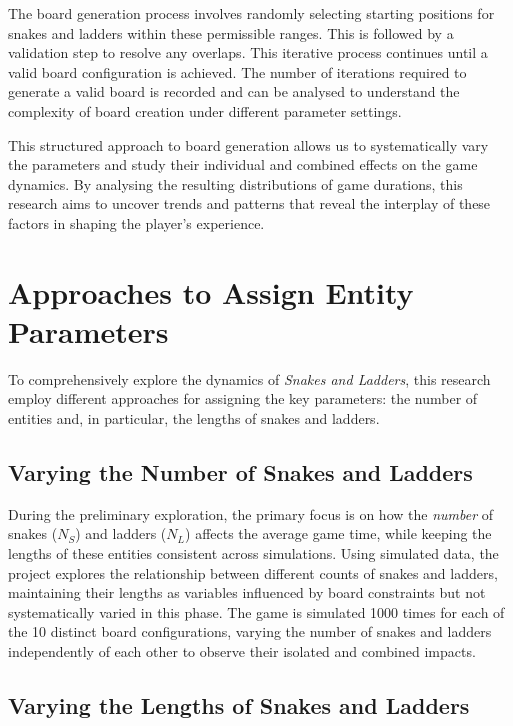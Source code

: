 \documentclass[12pt]{report}
\begin{document}
	The board generation process involves randomly selecting starting positions for snakes and ladders within these permissible ranges. This is followed by a validation step to resolve any overlaps. This iterative process continues until a valid board configuration is achieved. The number of iterations required to generate a valid board is recorded and can be analysed to understand the complexity of board creation under different parameter settings.
	
	This structured approach to board generation allows us to systematically vary the parameters and study their individual and combined effects on the game dynamics. By analysing the resulting distributions of game durations, this research aims to uncover trends and patterns that reveal the interplay of these factors in shaping the player's experience.
	
	\section{Approaches to Assign Entity Parameters}
	
	To comprehensively explore the dynamics of \textit{Snakes and Ladders}, this research employ different approaches for assigning the key parameters: the number of entities and, in particular, the lengths of snakes and ladders.
	
	\subsection{Varying the Number of Snakes and Ladders}
	
	During the preliminary exploration,  the primary focus is on how the \textit{number} of snakes ($N_S$) and ladders ($N_L$) affects the average game time, while keeping the lengths of these entities consistent across simulations. Using simulated data, the project explores the relationship between different counts of snakes and ladders, maintaining their lengths as variables influenced by board constraints but not systematically varied in this phase. The game is simulated 1000 times for each of the 10 distinct board configurations, varying the number of snakes and ladders independently of each other to observe their isolated and combined impacts.
	
	\subsection{Varying the Lengths of Snakes and Ladders}
	
\end{document}
